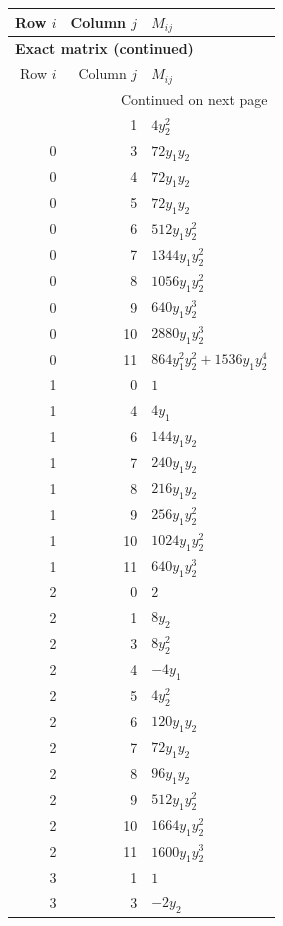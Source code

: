 \documentclass[10pt,a4paper]{article}
\begin{document}
{\small\setlength{\tabcolsep}{7pt}\begin{longtable}{rrp{125mm}}
\toprule Row $i$ & Column $j$ & $M_{ij}$\\\midrule\endfirsthead
\multicolumn{3}{l}{\textbf{Exact matrix (continued)}}\\
\toprule Row $i$ & Column $j$ & $M_{ij}$\\\midrule\endhead
\midrule\multicolumn{3}{r}{Continued on next page}\\\endfoot\bottomrule\endlastfoot
0 & 1 & $4 y_{2}^{2}$\\
0 & 3 & $72 y_{1} y_{2}$\\
0 & 4 & $72 y_{1} y_{2}$\\
0 & 5 & $72 y_{1} y_{2}$\\
0 & 6 & $512 y_{1} y_{2}^{2}$\\
0 & 7 & $1344 y_{1} y_{2}^{2}$\\
0 & 8 & $1056 y_{1} y_{2}^{2}$\\
0 & 9 & $640 y_{1} y_{2}^{3}$\\
0 & 10 & $2880 y_{1} y_{2}^{3}$\\
0 & 11 & $864 y_{1}^{2} y_{2}^{2} + 1536 y_{1} y_{2}^{4}$\\
1 & 0 & $1$\\
1 & 4 & $4 y_{1}$\\
1 & 6 & $144 y_{1} y_{2}$\\
1 & 7 & $240 y_{1} y_{2}$\\
1 & 8 & $216 y_{1} y_{2}$\\
1 & 9 & $256 y_{1} y_{2}^{2}$\\
1 & 10 & $1024 y_{1} y_{2}^{2}$\\
1 & 11 & $640 y_{1} y_{2}^{3}$\\
2 & 0 & $2$\\
2 & 1 & $8 y_{2}$\\
2 & 3 & $8 y_{2}^{2}$\\
2 & 4 & $- 4 y_{1}$\\
2 & 5 & $4 y_{2}^{2}$\\
2 & 6 & $120 y_{1} y_{2}$\\
2 & 7 & $72 y_{1} y_{2}$\\
2 & 8 & $96 y_{1} y_{2}$\\
2 & 9 & $512 y_{1} y_{2}^{2}$\\
2 & 10 & $1664 y_{1} y_{2}^{2}$\\
2 & 11 & $1600 y_{1} y_{2}^{3}$\\
3 & 1 & $1$\\
3 & 3 & $- 2 y_{2}$\\

\end{longtable}}
\end{document}
